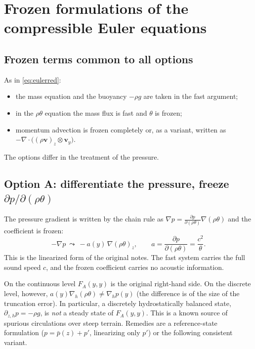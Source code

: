 \documentclass[11pt,a4paper]{article}
\theoremstyle{definition}
\theoremstyle{remark}
\begin{document}
\section{Frozen formulations of the compressible Euler equations}
\label{sec:frozen}

\subsection{Frozen terms common to all options}

As in \eqref{eq:eulerred}:
\begin{itemize}
\item the mass equation and the buoyancy $-\rho g$ are taken in the fast
  argument;
\item in the $\rho\theta$ equation the mass flux is fast and $\theta$ is
  frozen;
\item momentum advection is frozen completely or, as a variant, written
  as $-\nabla\cdot\big((\rho\mathbf v)_z\otimes\mathbf v_y\big)$.
\end{itemize}
The options differ in the treatment of the pressure.

\subsection{Option A: differentiate the pressure, freeze $\partial p/\partial(\rho\theta)$}

The pressure gradient is written by the chain rule as
$\nabla p=\frac{\partial p}{\partial(\rho\theta)}\nabla(\rho\theta)$ and
the coefficient is frozen:
\begin{equation*}
 -\nabla p\ \leadsto\ -a(y)\,\nabla(\rho\theta)_z,\qquad
 a=\frac{\partial p}{\partial(\rho\theta)}=\frac{c^2}{\theta}.
\end{equation*}
This is the linearized form of the original notes. The fast system
carries the full sound speed $c$, and the frozen coefficient carries no
acoustic information.

On the continuous level $F_A(y,y)$ is the original right-hand side. On
the discrete level, however,
$a(y)\nabla_h(\rho\theta)\ne\nabla_hp(y)$ (the difference is of the size
of the truncation error). In particular, a discretely hydrostatically
balanced state, $\partial_{z,h}p=-\rho g$, is \emph{not} a steady state of
$F_A(y,y)$. This is a known source of spurious circulations over steep
terrain. Remedies are a reference-state formulation
($p=\bar p(z)+p'$, linearizing only $p'$) or the following consistent
variant.
\end{document}
